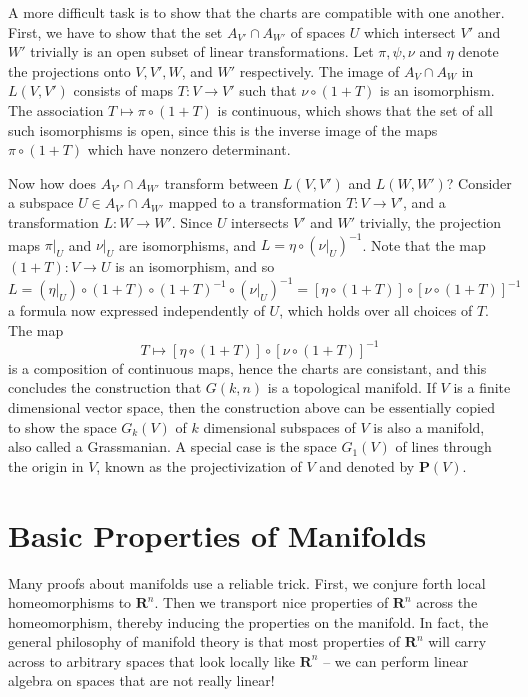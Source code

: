 \begin{example}[Grassmannian]
A more difficult task is to show that the charts are compatible with one another. First, we have to show that the set $A_{V'} \cap A_{W'}$ of spaces $U$ which intersect $V'$ and $W'$ trivially is an open subset of linear transformations. Let $\pi, \psi, \nu$ and $\eta$ denote the projections onto $V, V', W$, and $W'$ respectively. The image of $A_V \cap A_W$ in $L(V,V')$ consists of maps $T: V \to V'$ such that $\nu \circ (1 + T)$ is an isomorphism. The association $T \mapsto \pi \circ (1 + T)$ is continuous, which shows that the set of all such isomorphisms is open, since this is the inverse image of the maps $\pi \circ (1 + T)$ which have nonzero determinant.

Now how does $A_{V'} \cap A_{W'}$ transform between $L(V,V')$ and $L(W,W')$? Consider a subspace $U \in A_{V'} \cap A_{W'}$ mapped to a transformation $T: V \to V'$, and a transformation $L: W \to W'$. Since $U$ intersects $V'$ and $W'$ trivially, the projection maps $\pi|_U$ and $\nu|_U$ are isomorphisms, and $L = \eta \circ (\nu|_U)^{-1}$. Note that the map $(1 + T): V \to U$ is an isomorphism, and so
%
\[ L = (\eta|_U) \circ (1 + T) \circ (1 + T)^{-1} \circ (\nu|_U)^{-1} = [\eta \circ (1 + T)] \circ [\nu \circ (1 + T)]^{-1} \]
%
a formula now expressed independently of $U$, which holds over all choices of $T$. The map
%
\[ T \mapsto [\eta \circ (1 + T)] \circ [\nu \circ (1 + T)]^{-1} \]
%
is a composition of continuous maps, hence the charts are consistant, and this concludes the construction that $G(k,n)$ is a topological manifold. If $V$ is a finite dimensional vector space, then the construction above can be essentially copied to show the space $G_k(V)$ of $k$ dimensional subspaces of $V$ is also a manifold, also called a Grassmanian. A special case is the space $G_1(V)$ of lines through the origin in $V$, known as the projectivization of $V$ and denoted by $\mathbf{P}(V)$.
\end{example}

\section{Basic Properties of Manifolds}

Many proofs about manifolds use a reliable trick. First, we conjure forth local homeomorphisms to $\mathbf{R}^n$. Then we transport nice properties of $\mathbf{R}^n$ across the homeomorphism, thereby inducing the properties on the manifold. In fact, the general philosophy of manifold theory is that most properties of $\mathbf{R}^n$ will carry across to arbitrary spaces that look locally like $\mathbf{R}^n$ -- we can perform linear algebra on spaces that are not really linear!

